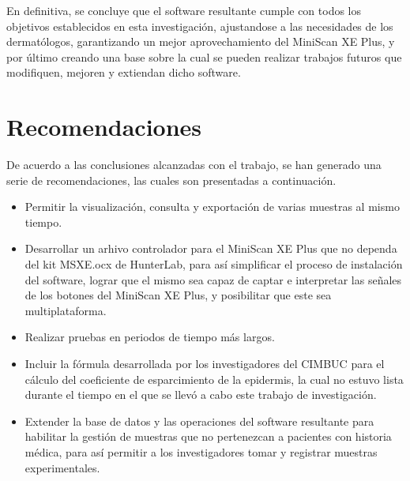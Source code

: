	En definitiva, se concluye que el software resultante cumple con todos los objetivos establecidos en esta investigaci\'{o}n, ajustandose a las necesidades de los dermat\'{o}logos, garantizando un mejor aprovechamiento del MiniScan XE Plus, y por \'{u}ltimo creando una base sobre la cual se pueden realizar trabajos futuros que modifiquen, mejoren y extiendan dicho software.

\section{Recomendaciones}

	De acuerdo a las conclusiones alcanzadas con el trabajo, se han generado una serie de recomendaciones, las cuales son presentadas a continuaci\'{o}n.

\begin{itemize}

	\item Permitir la visualizaci\'{o}n, consulta y exportaci\'{o}n de varias muestras al mismo tiempo.
	
	\item Desarrollar un arhivo controlador para el MiniScan XE Plus que no dependa del kit MSXE.ocx de HunterLab, para as\'{i} simplificar el proceso de instalaci\'{o}n del software, lograr que el mismo sea capaz de captar e interpretar las se\~{n}ales de los botones del MiniScan XE Plus, y posibilitar que este sea multiplataforma.
	
	\item Realizar pruebas en periodos de tiempo m\'{a}s largos.
	
	\item Incluir la f\'{o}rmula desarrollada por los investigadores del CIMBUC para el c\'{a}lculo del coeficiente de esparcimiento de la epidermis, la cual no estuvo lista durante el tiempo en el que se llev\'{o} a cabo este trabajo de investigaci\'{o}n.
	
	\item Extender la base de datos y las operaciones del software resultante para habilitar la gesti\'{o}n de muestras que no pertenezcan a pacientes con historia m\'{e}dica, para as\'{i} permitir a los investigadores tomar y registrar muestras experimentales.
\end{itemize}